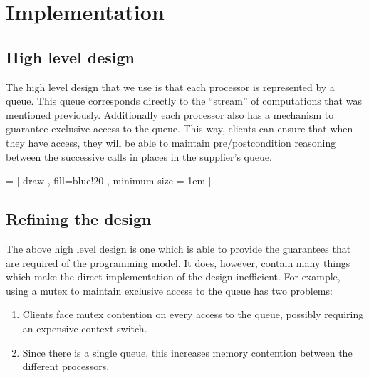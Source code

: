 \documentclass[a4]{article}
\begin{document}
\section{Implementation}
\subsection{High level design}
The high level design that we use is that each processor is
represented by a queue.
This queue corresponds directly to the ``stream'' of computations
that was mentioned previously.
Additionally each processor also has a mechanism to
guarantee exclusive access to the queue.
This way,
clients can ensure that when they have access,
they will be able to maintain pre/postcondition reasoning
between the successive calls in places in the supplier's queue.

 =
  [ draw
  , fill=blue!20
  , minimum size = 1em
  ]

\def\queueAt#1#2#3{
  \foreach \x in {0, 1,...,4} {
    \node[queue_block] at (#1 em + \x em, #2 em) (queue_block_\x_#3) {};
  }
}
\begin{center}
\end{center}
\subsection{Refining the design}
The above high level design is one which is able to provide
the guarantees that are required of the programming model.
It does, however, contain many things which make the
direct implementation of the design inefficient.
For example,
using a mutex to maintain exclusive access to the queue
has two problems:

\begin{enumerate}
\item Clients face mutex contention on every access to the queue,
  possibly requiring an expensive context switch.
\item Since there is a single queue, this increases memory contention between
  the different processors.
\end{enumerate}
\end{document}
